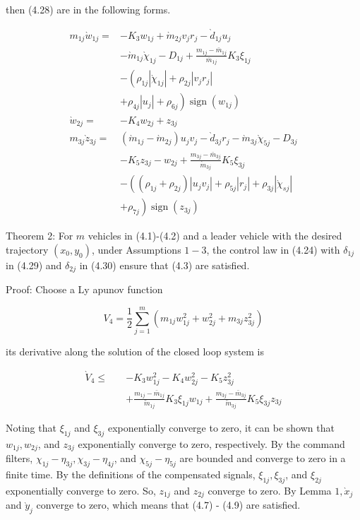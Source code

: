 \documentclass[10pt]{article}
\begin{document}
then (4.28) are in the following forms.

$$
\begin{aligned}
m_{1 j} \grave{w}_{1 j}= & -K_{3} w_{1 j}+\grave{m}_{2 j} v_{j} r_{j}-\grave{d}_{1 j} u_{j} \\
& -\grave{m}_{1 j} \grave{\chi}_{1 j}-D_{1 j}+\frac{m_{1 j}-\bar{m}_{1 j}}{\bar{m}_{1 j}} K_{3} \xi_{1 j} \\
& -\left(\rho_{1 j}\left|\grave{\chi}_{1 j}\right|+\rho_{2 j}\left|v_{j} r_{j}\right|\right. \\
& \left.+\rho_{4 j}\left|u_{j}\right|+\rho_{6 j}\right) \operatorname{sign}\left(w_{1 j}\right) \\
\grave{w}_{2 j}= & -K_{4} w_{2 j}+z_{3 j} \\
m_{3 j} \grave{z}_{3 j}= & \left(\grave{m}_{1 j}-\grave{m}_{2 j}\right) u_{j} v_{j}-\grave{d}_{3 j} r_{j}-\grave{m}_{3 j} \grave{\chi}_{5 j}-D_{3 j} \\
& -K_{5} z_{3 j}-w_{2 j}+\frac{m_{3 j}-\bar{m}_{3 j}}{\grave{m}_{3 j}} K_{5} \xi_{3 j} \\
& -\left(\left(\rho_{1 j}+\rho_{2 j}\right)\left|u_{j} v_{j}\right|+\rho_{5 j}\left|r_{j}\right|+\rho_{3 j}\left|\grave{\chi}_{s j}\right|\right. \\
& \left.+\rho_{7 j}\right) \operatorname{sign}\left(z_{3 j}\right)
\end{aligned}
$$

Theorem 2: For $m$ vehicles in (4.1)-(4.2) and a leader vehicle with the desired trajectory $\left(x_{0}, y_{0}\right)$, under Assumptions $1-3$, the control law in (4.24) with $\delta_{1 j}$ in (4.29) and $\delta_{2 j}$ in (4.30) ensure that (4.3) are satisfied.

Proof: Choose a Ly apunov function

$$
V_{4}=\frac{1}{2} \sum_{j=1}^{m}\left(m_{1 j} w_{1 j}^{2}+w_{2 j}^{2}+m_{3 j} z_{3 j}^{2}\right)
$$

its derivative along the solution of the closed loop system is

$$
\begin{aligned}
\grave{V}_{4} \leq \quad & -K_{3} w_{1 j}^{2}-K_{4} w_{2 j}^{2}-K_{5} z_{3 j}^{2} \\
& +\frac{m_{1 j}-\bar{m}_{1 j}}{\overleftarrow{m}_{1 j}} K_{3} \xi_{1 j} w_{1 j}+\frac{m_{3 j}-\bar{m}_{3 j}}{\overleftarrow{m}_{3 j}} K_{5} \xi_{3 j} z_{3 j}
\end{aligned}
$$

Noting that $\xi_{1 j}$ and $\xi_{3 j}$ exponentially converge to zero, it can be shown that $w_{1 j}, w_{2 j}$, and $z_{3 j}$ exponentially converge to zero, respectively. By the command filters, $\chi_{1 j}-\eta_{3 j}, \chi_{3 j}-\eta_{4 j}$, and $\chi_{5 j}-\eta_{5 j}$ are bounded and converge to zero in a finite time. By the definitions of the compensated signals, $\xi_{1 j}, \xi_{3 j}$, and $\xi_{2 j}$ exponentially converge to zero. So, $z_{1 j}$ and $z_{2 j}$ converge to zero. By Lemma $1, \grave{x}_{j}$ and $\grave{y}_{j}$ converge to zero, which means that (4.7) - (4.9) are satisfied.
\end{document}
